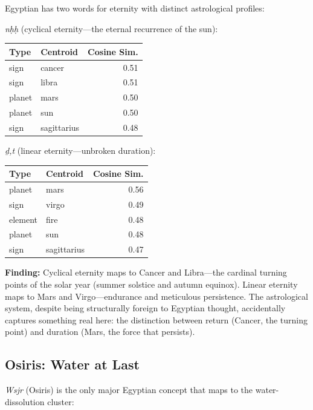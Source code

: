 \documentclass[11pt, a4paper]{article}
\begin{document}
Egyptian has two words for eternity with distinct astrological profiles:

\textit{nḥḥ} (cyclical eternity---the eternal recurrence of the sun):

\begin{table}[H]
\centering
\begin{tabular}{llr}
\toprule
\textbf{Type} & \textbf{Centroid} & \textbf{Cosine Sim.} \\
\midrule
sign & cancer & 0.51 \\
sign & libra & 0.51 \\
planet & mars & 0.50 \\
planet & sun & 0.50 \\
sign & sagittarius & 0.48 \\
\bottomrule
\end{tabular}
\end{table}

\textit{ḏ,t} (linear eternity---unbroken duration):

\begin{table}[H]
\centering
\begin{tabular}{llr}
\toprule
\textbf{Type} & \textbf{Centroid} & \textbf{Cosine Sim.} \\
\midrule
planet & mars & 0.56 \\
sign & virgo & 0.49 \\
element & fire & 0.48 \\
planet & sun & 0.48 \\
sign & sagittarius & 0.47 \\
\bottomrule
\end{tabular}
\end{table}

{\color{insight}\textbf{Finding:}} Cyclical eternity maps to Cancer and Libra---the cardinal turning points of the solar year (summer solstice and autumn equinox). Linear eternity maps to Mars and Virgo---endurance and meticulous persistence. The astrological system, despite being structurally foreign to Egyptian thought, accidentally captures something real here: the distinction between return (Cancer, the turning point) and duration (Mars, the force that persists).

\subsection{Osiris: Water at Last}

\textit{Wsjr} (Osiris) is the only major Egyptian concept that maps to the water-dissolution cluster:
\end{document}
